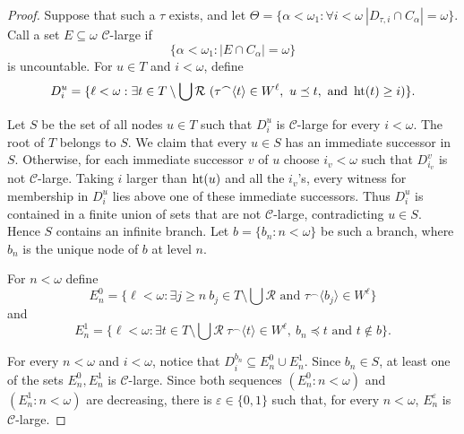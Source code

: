 \begin{proof}
Suppose that such a $\tau$ exists, and let $\Theta=\{\alpha<\omega_1:
\forall i<\omega\ |D_{\tau,i}\cap C_\alpha|=\omega\}$.
Call a set $E\subseteq\omega$ $\mathcal C$-large if
\[
  \{\alpha<\omega_1: |E\cap C_\alpha|=\omega\}
\]
is uncountable.
For $u\in T$ and $i<\omega$, define
\[
  D^u_i=
  \{\ell<\omega:
    \exists t\in T\setminus\bigcup\mathcal R\ 
    (
      \tau^\frown\langle t\rangle\in W^\ell,\ u\preceq t,
      \text{ and }\htt(t)\geq i
    )\}.
\]

Let $S$ be the set of all nodes $u\in T$ such that $D^u_i$ is
$\mathcal C$-large for every $i<\omega$.  The root of $T$ belongs to $S$.
We claim that every $u\in S$ has an immediate successor in $S$.  Otherwise,
for each immediate successor $v$ of $u$ choose $i_v<\omega$ such that
$D^v_{i_v}$ is not $\mathcal C$-large.  Taking $i$ larger than $\operatorname{ht}(u)$ and
all the $i_v$'s, every witness for membership in $D^u_i$ lies above one of
these immediate successors.  Thus $D^u_i$ is contained in a finite union of
sets that are not $\mathcal C$-large, contradicting $u\in S$.  Hence $S$
contains an infinite branch.  Let
$b=\{b_n:n<\omega\}$ be such a branch, where $b_n$ is the unique node of $b$ at level $n$.

For $n<\omega$ define
\[
  E^0_n=
  \{\ell<\omega:\exists j\geq n\ b_j \in T\setminus\bigcup\mathcal R\text{ and }
    \tau^\frown\langle b_j\rangle\in W^\ell\}
\]
and
\[
  E^1_n=
  \{\ell<\omega: \exists t\in T\setminus\bigcup\mathcal R\ 
    \tau^\frown\langle t\rangle\in W^\ell,\ b_n\preceq t
    \text{ and } t\notin b\}.
\]

For every $n<\omega$ and $i<\omega$, notice that
$D^{b_n}_i\subseteq E^0_n\cup E^1_n$. Since $b_n\in S$, at least one of the
sets $E^0_n,E^1_n$ is $\mathcal C$-large.
Since both sequences $(E^0_n:n<\omega)$ and $(E^1_n:n<\omega)$ are decreasing,
there is $\varepsilon\in\{0,1\}$ such that, for every $n<\omega$,
$E^\varepsilon_n$ is $\mathcal C$-large.


\end{proof}
